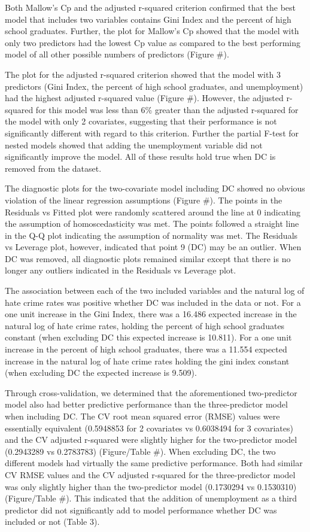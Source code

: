 \documentclass[
]{article}
\begin{document}
Both Mallow's Cp and the adjusted r-squared criterion confirmed that the
best model that includes two variables contains Gini Index and the
percent of high school graduates. Further, the plot for Mallow's Cp
showed that the model with only two predictors had the lowest Cp value
as compared to the best performing model of all other possible numbers
of predictors (Figure \#).

The plot for the adjusted r-squared criterion showed that the model with
3 predictors (Gini Index, the percent of high school graduates, and
unemployment) had the highest adjusted r-squared value (Figure \#).
However, the adjusted r-squared for this model was less than 6\% greater
than the adjusted r-squared for the model with only 2 covariates,
suggesting that their performance is not significantly different with
regard to this criterion. Further the partial F-test for nested models
showed that adding the unemployment variable did not significantly
improve the model. All of these results hold true when DC is removed
from the dataset.

The diagnostic plots for the two-covariate model including DC showed no
obvious violation of the linear regression assumptions (Figure \#). The
points in the Residuals vs Fitted plot were randomly scattered around
the line at 0 indicating the assumption of homoscedasticity was met. The
points followed a straight line in the Q-Q plot indicating the
assumption of normality was met. The Residuals vs Leverage plot,
however, indicated that point 9 (DC) may be an outlier. When DC was
removed, all diagnostic plots remained similar except that there is no
longer any outliers indicated in the Residuals vs Leverage plot.

The association between each of the two included variables and the
natural log of hate crime rates was positive whether DC was included in
the data or not. For a one unit increase in the Gini Index, there was a
16.486 expected increase in the natural log of hate crime rates, holding
the percent of high school graduates constant (when excluding DC this
expected increase is 10.811). For a one unit increase in the percent of
high school graduates, there was a 11.554 expected increase in the
natural log of hate crime rates holding the gini index constant (when
excluding DC the expected increase is 9.509).

Through cross-validation, we determined that the aforementioned
two-predictor model also had better predictive performance than the
three-predictor model when including DC. The CV root mean squared error
(RMSE) values were essentially equivalent (0.5948853 for 2 covariates vs
0.6038494 for 3 covariates) and the CV adjusted r-squared were slightly
higher for the two-predictor model (0.2943289 vs 0.2783783)
(Figure/Table \#). When excluding DC, the two different models had
virtually the same predictive performance. Both had similar CV RMSE
values and the CV adjusted r-squared for the three-predictor model was
only slightly higher than the two-predictor model (0.1730294 vs
0.1530310) (Figure/Table \#). This indicated that the addition of
unemployment as a third predictor did not significantly add to model
performance whether DC was included or not (Table 3).
\end{document}
